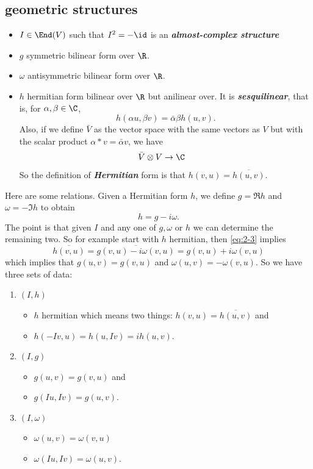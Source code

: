 \subsection{geometric structures}
\begin{defn}\leavevmode
	\begin{itemize}
		\item $I\in\End(V)$ such that $I^2=-\id$ is an \textbf{\textit{almost-complex structure}}
		\item $g$ symmetric bilinear form over $\R$.
		\item $\omega$ antisymmetric bilinear form over $\R$.
		\item $h$ hermitian form bilinear over $\R$ but anilinear over. It is \textbf{\textit{sesquilinear}}, that is, for $\alpha,\beta\in\C$,
		\[h(\alpha u,\beta v)=\bar\alpha\beta h(u,v).\]
		Also, if we define $\bar V$ as the vector space with the same vectors as $V$ but with the scalar product $\alpha * v=\bar\alpha v$, we have
		\begin{align*}
			\bar V\otimes V&\to\C
		\end{align*}
		So the definition of \textbf{\textit{Hermitian}} form is that $h(v,u)=\overline{h(u,v)}$.
	\end{itemize}
\end{defn}
Here are some relations. Given a Hermitian form $h$, we define $g=\Re h$ and $\omega=-\Im h$ to obtain
\begin{equation}\label{eq:2-3}
	h=g-i\omega.
\end{equation}
The point is that given $I$ and any one of $g,\omega$ or $h$ we can determine the remaining two. So for example start with $h$ hermitian, then \cref{eq:2-3} implies
\[\overline{h(v,u)}=\overline{g(v,u)-i\omega(v,u)}=g(v,u)+i\omega(v,u)\]
which implies that $g(u,v)=g(v,u)$ and $\omega(u,v)=-\omega(v,u)$.
So we have three sets of data:
\begin{enumerate}
	\item $(I,h)$
	\begin{itemize}
		\item $h$ hermitian which means two things: $h(v,u)=\overline{h(u,v)}$ and
		\item $h(-Iv,u)=h(u,Iv)=ih(u,v)$.
	\end{itemize}
	\item $(I,g)$
	\begin{itemize}
		\item $g(u,v)=g(v,u)$ and
		\item $g(Iu,Iv)=g(u,v)$.
	\end{itemize}
	\item $(I,\omega)$
	\begin{itemize}
		\item $\omega(u,v)=\omega(v,u)$
		\item $\omega(Iu,Iv)=\omega(u,v)$.
	\end{itemize}
\end{enumerate}
